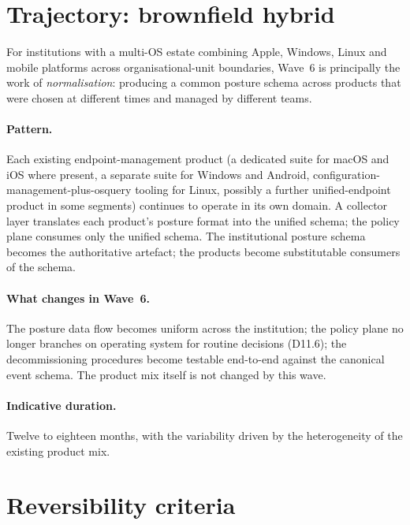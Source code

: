 \section{Trajectory: brownfield hybrid}
\label{sec:w6-brownfield-hybrid}

For institutions with a multi-OS estate combining Apple, Windows,
Linux and mobile platforms across organisational-unit boundaries, Wave~6 is
principally the work of \emph{normalisation}: producing a common
posture schema across products that were chosen at different times
and managed by different teams.

\paragraph{Pattern.} Each existing endpoint-management product
(a dedicated suite for macOS and iOS where present, a separate
suite for Windows and Android, configuration-management-plus-osquery
tooling for Linux, possibly a further unified-endpoint product in
some segments) continues to operate in its own domain. A
collector layer translates each product's posture format into the
unified schema; the policy plane consumes only the unified schema.
The institutional posture schema becomes the authoritative artefact;
the products become substitutable consumers of the schema.

\paragraph{What changes in Wave~6.} The posture data flow becomes
uniform across the institution; the policy plane no longer
branches on operating system for routine decisions (D11.6); the
decommissioning procedures become testable end-to-end against the
canonical event schema. The product mix itself is not changed by
this wave.

\paragraph{Indicative duration.} Twelve to eighteen months, with
the variability driven by the heterogeneity of the existing
product mix.

\section{Reversibility criteria}
\label{sec:w6-reversibility}

